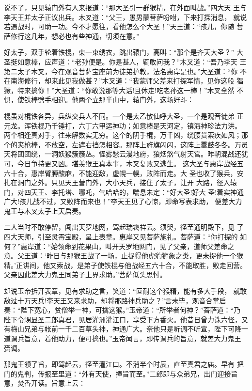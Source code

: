说不了，只见辕门外有人来报道：“那大圣引一群猴精，在外面叫战。”四大天
王与李天王并太子正议出兵。木叉道：“父王，愚男蒙菩萨吩咐，下来打探消息，
就说若遇战时，可助一功。今不才愿往，看他怎么个大圣！”天王道：“孩儿，你随
菩萨修行这几年，想必也有些神通，切须在意。”

好太子，双手轮着铁棍，束一束绣衣，跳出辕门，高叫：“那个是齐天大圣？”
大圣挺如意棒，应声道：“老孙便是。你是甚人，辄敢问我？”木叉道：“吾乃李天
王第二太子木叉，今在观音菩萨宝座前为徒弟护教，法名惠岸是也。”大圣道：“你
不在南海修行，却来此见我做甚？”木叉道：“我蒙师父差来打探军情，见你这般
猖獗，特来擒你！”大圣道：“你敢说那等大话!且休走!吃老孙这一棒！”木叉全然
不惧，使铁棒劈手相迎。他两个立那半山中，辕门外，这场好斗：

棍虽对棍铁各异，兵纵交兵人不同。一个是太乙散仙呼大圣，一个是观音徒弟
正元龙。浑铁棍乃千锤打，六丁六甲运神功；如意棒是天河定，镇海神珍法力洪。
两个相逢真对手，往来解数实无穷。这个的阴手棍，万千凶，绕腰贯索疾如风；那
个的夹枪棒，不放空，左遮右挡怎相容。那阵上旌旗闪闪，这阵上鼍鼓冬冬。万员
天将团团绕，一洞妖猴簇簇丛。怪雾愁云漫地府，狼烟煞气射天宫。昨朝混战还犹
可，今日争持更又凶。堪羡猴王真本事，木叉复败又逃生。
这大圣与惠岸战经五六十合，惠岸臂膊酸麻，不能迎敌，虚幌一幌，败阵而走。大
圣也收了猴兵，安扎在洞门之外。只见天王营门外，大小天兵，接住了太子，让开
大路，径入辕门，对四天王、李托塔、哪吒，气哈哈的，喘息未定：“好大圣!好大
圣!着实神通广大!孩儿战不过，又败阵而来也！”李天王见了心惊，即命写表求助，
便差大力鬼王与木叉太子上天启奏。

二人当时不敢停留，闯出天罗地网，驾起瑞霭祥云。须臾，径至通明殿下，见
了四大天师，引至灵霄宝殿，呈上表章。惠岸又见菩萨施礼。菩萨道：“你打探的
如何？”惠岸道：“始领命到花果山，叫开天罗地网门，见了父亲，道师父差命之
意。父王道：‘昨日与那猴王战了一场，止捉得他虎豹狮象之类，更未捉他一个猴
精。’正讲间，他又索战，是弟子使铁棍与他战经五六十合，不能取胜，败走回营。
父亲因此差大力鬼王同弟子上界求助。”菩萨低头思忖。

却说玉帝拆开表章，见有求助之言，笑道：“叵耐这个猴精，能有多大手段，
就敢敌过十万天兵!李天王又来求助，却将那路神兵助之？”言未毕，观音合掌启
奏：“陛下宽心，贫僧举一神，可擒这猴。”玉帝道：“所举者何神？”菩萨道：“乃
陛下令甥显圣二郎真君，见居灌洲灌江口，享受下方香火。他昔日曾力诛六怪，又
有梅山兄弟与帐前一千二百草头神，神通广大。奈他只是听调不听宣，陛下可降一
道调兵旨意，着他助力，便可擒也。”玉帝闻言，即传调兵的旨意，就差大力鬼王
赍调。

那鬼王领了旨，即驾起云，径至灌江口。不消半个时辰，直至真君之庙。早有
把门的鬼判，传报至里道：“外有天使，捧旨而至。”二郎即与众弟兄，出门迎接旨
意，焚香开读。旨意上云：

